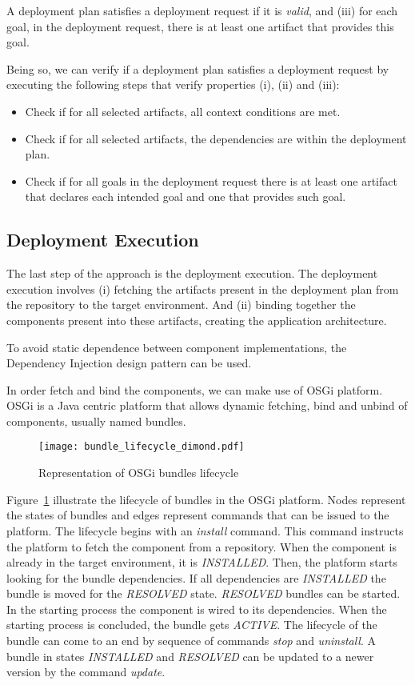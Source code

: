 A deployment plan satisfies a deployment request if it is \emph{valid}, and (iii) for each goal, in the deployment request, there is at least one artifact that provides this goal.

Being so, we can verify if a deployment plan satisfies a deployment request by executing the following steps that verify properties (i), (ii) and (iii):

\begin{itemize}
  \item Check if for all selected artifacts, all context conditions are met.
  \item Check if for all selected artifacts, the dependencies are within the deployment plan.
  \item Check if for all goals in the deployment request there is at least one artifact that declares each intended goal and one that provides such goal.
\end{itemize}

\subsection{Deployment Execution}

The last step of the approach is the deployment execution. The deployment execution involves (i) fetching the artifacts present in the deployment plan from the repository to the target environment. And (ii) binding together the components present into these artifacts, creating the application architecture.

To avoid static dependence between component implementations, the Dependency Injection\cite{fowler_inversion_2004} design pattern can be used.

In order fetch and bind the components, we can make use of OSGi platform\cite{the_osgi_alliance_osgi_2007}. OSGi is a Java centric platform that allows dynamic fetching, bind and unbind of components, usually named bundles.

\begin{figure}[!htb]
  \centering
  \texttt{[image: bundle\_lifecycle\_dimond.pdf]}
  \caption{Representation of OSGi bundles lifecycle}
  \label{fig:osgi_bundles}
\end{figure}

Figure~\ref{fig:osgi_bundles} illustrate the lifecycle of bundles in the OSGi platform\cite{the_osgi_alliance_osgi_2007}. Nodes represent the states of bundles and edges represent commands that can be issued to the platform.
The lifecycle begins with an \emph{install} command. This command instructs the platform to fetch the component from a repository. When the component is already in the target environment, it is \emph{INSTALLED}. Then, the platform starts looking for the bundle dependencies. If all dependencies are \emph{INSTALLED} the bundle is moved for the \emph{RESOLVED} state. \emph{RESOLVED} bundles can be started. In the starting process the component is wired to its dependencies. When the starting process is concluded, the bundle gets \emph{ACTIVE}. The lifecycle of the bundle can come to an end by sequence of commands \emph{stop} and \emph{uninstall}. A bundle in states \emph{INSTALLED} and \emph{RESOLVED} can be updated to a newer version by the command \emph{update}.
